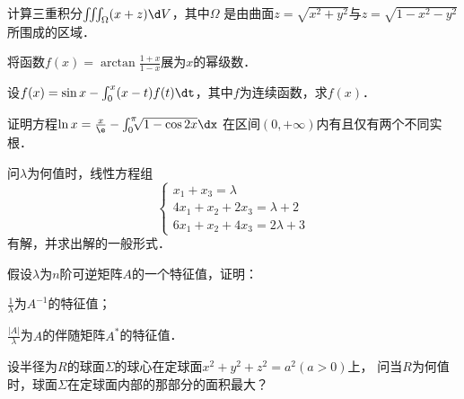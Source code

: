 \documentclass[plain,noanswer,medmath]{../../template/jnuexam}
\begin{document}
\begin{problem}
计算三重积分$\iiint_{\Omega}(x+z)\d V$，其中$\Omega$
是由曲面$z=\sqrt{x^2+y^2}$与$z=\sqrt{1-x^2-y^2}$所围成的区域．
\end{problem}



\begin{problem}
将函数$f(x)=\arctan\frac{1+x}{1-x}$展为$x$的幂级数．
\end{problem}



\begin{problem}
设$f(x)=\sin x-\int_0^x (x-t)f(t)\dt$，其中$f$为连续函数，求$f(x)$．
\end{problem}



\begin{problem}
证明方程$\ln x=\frac{x}{\e}-\int_0^{\pi}\!\!\!\sqrt{1-\cos 2x}\dx$
在区间$(0,+\infty)$内有且仅有两个不同实根．
\end{problem}



\begin{problem}
问$\lambda$为何值时，线性方程组
$$\begin{cases}
  x_1+ x_3=\lambda \\
  4x_1+x_2+2x_3=\lambda +2 \\
  6x_1+x_2+4x_3=2\lambda +3
\end{cases}$$
有解，并求出解的一般形式．
\end{problem}



\begin{problem}
假设$\lambda$为$n$阶可逆矩阵$A$的一个特征值，证明：\par
\begin{enumerate*}
\item $\frac{1}{\lambda}$为$A^{-1}$的特征值；
\item $\frac{|A|}{\lambda}$为$A$的伴随矩阵$A^*$的特征值．
\end{enumerate*}
\end{problem}



\begin{problem}
设半径为$R$的球面$\Sigma$的球心在定球面$x^2+y^2+z^2=a^2(a>0)$上，
问当$R$为何值时，球面$\Sigma$在定球面内部的那部分的面积最大？
\end{problem}
\end{document}
